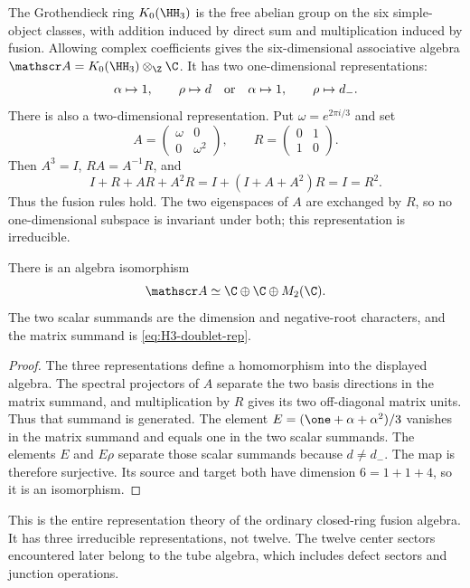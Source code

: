 The Grothendieck ring $K_0(\HH_3)$ is the free abelian group on the
six simple-object classes, with addition induced by direct sum and
multiplication induced by fusion. Allowing complex coefficients gives
the six-dimensional associative algebra
$\mathscr A=K_0(\HH_3)\otimes_\Z\C$. It has two one-dimensional
representations:
\begin{equation}
 \alpha\mapsto1,\qquad \rho\mapsto d
 \quad\hbox{or}\quad
 \alpha\mapsto1,\qquad \rho\mapsto d_-.
 \label{eq:H3-scalar-reps}
\end{equation}
There is also a two-dimensional representation.  Put
$\omega=e^{2\pi i/3}$ and set
\begin{equation}
 A=\begin{pmatrix}\omega&0\\0&\omega^2\end{pmatrix},
 \qquad R=\begin{pmatrix}0&1\\1&0\end{pmatrix}.
 \label{eq:H3-doublet-rep}
\end{equation}
Then $A^3=I$, $RA=A^{-1}R$, and
\[
 I+R+AR+A^2R=I+(I+A+A^2)R=I=R^2.
\]
Thus the fusion rules hold.  The two eigenspaces of $A$ are exchanged
by $R$, so no one-dimensional subspace is invariant under both; this
representation is irreducible.

\begin{proposition}
There is an algebra isomorphism
\begin{equation}
 \mathscr A\simeq\C\oplus\C\oplus M_2(\C).
 \label{eq:H3-fusion-Wedderburn}
\end{equation}
The two scalar summands are the dimension and negative-root
characters, and the matrix summand is \eqref{eq:H3-doublet-rep}.
\end{proposition}
\begin{proof}
The three representations define a homomorphism into the displayed
algebra.  The spectral projectors of $A$ separate the two basis
directions in the matrix summand, and multiplication by $R$ gives
its two off-diagonal matrix units.  Thus that summand is generated.
The element
$E=(\one+\alpha+\alpha^2)/3$ vanishes in the matrix summand
and equals one in the two scalar summands.  The elements $E$ and
$E\rho$ separate those scalar summands because $d\ne d_-$.
The map is therefore surjective.  Its source and target both have
dimension $6=1+1+4$, so it is an isomorphism.
\end{proof}

This is the entire representation theory of the ordinary closed-ring
fusion algebra.  It has three irreducible representations, not twelve.
The twelve center sectors encountered later belong to the tube
algebra, which includes defect sectors and junction operations.

